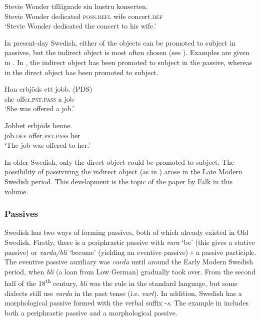 \documentclass[output=paper]{langscibook}
\begin{document}
\ex
\gll  Stevie Wonder   tillägnade   sin       hustru   konserten.\\
        Stevie Wonder  dedicated  \textsc{poss.refl}  wife     concert\textsc{.def}  \\
\glt        ‘Stevie Wonder dedicated the concert to his wife.’ \citep[137]{Lundquist2014Double}
\z
\z

In present-day Swedish, either of the objects can be promoted to subject in passives, but the indirect object is most often chosen (see \citealt{Lundquist2004}). Examples are given in . In , the indirect object has been promoted to subject in the passive, whereas in  the direct object has been promoted to subject.


\ea\label{ex:intro:28}
\ea\label{ex:intro:28a}
\gll  Hon   erbjöds         ett jobb. (PDS)\\
she   offer\textsc{.pst.pass}   a    job\\
\glt ‘She was offered a job.’

\ex\label{ex:intro:28b}
\gll  Jobbet   erbjöds         henne. \\
  job.\textsc{def}     offer.\textsc{pst.pass} her\\
    \glt `The job was offered to her.’
\z
\z



In older Swedish, only the direct object could be promoted to subject. The possibility of passivizing the indirect object (as in ) arose in the Late Modern Swedish period. This development is the topic of the paper by Falk in this volume.


\subsubsection{Passives}\label{sec:intro:3.3.2}


Swedish has two ways of forming passives, both of which already existed in Old Swedish. Firstly, there is a periphrastic passive with \textit{vara} ‘be’ (this gives a stative passive) or \textit{varda/bli} ‘become’ (yielding an eventive passive)\,+\,a passive participle. The eventive passive auxiliary was \textit{varda} until around the Early Modern Swedish period, when \textit{bli} (a loan from Low German) gradually took over. From the second half of the 18\textsuperscript{th} century, \textit{bli} was the rule in the standard language, but some dialects still use \textit{varda} in the past tense (i.e. \textit{vart}). In addition, Swedish has a morphological passive formed with the verbal suffix -\textit{s}. The example in  includes both a periphrastic passive and a morphological passive.
\end{document}

